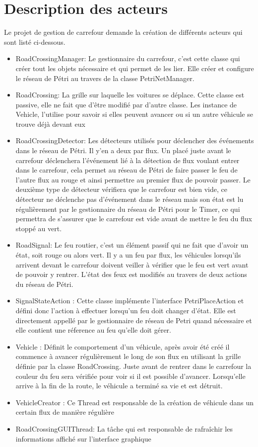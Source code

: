 \chapter{Description des acteurs}

Le projet de gestion de carrefour demande la création de différents acteurs qui sont listé ci-dessous.

\begin{itemize}
\item  RoadCrossingManager: Le gestionnaire du carrefour, c'est cette classe qui créer tout les objets nécessaire et qui permet de les lier. Elle créer et configure le réseau de Pétri au travers de la classe PetriNetManager.
\item RoadCrossing: La grille sur laquelle les voitures se déplace. Cette classe est passive, elle ne fait que d'être modifié par d'autre classe. Les instance de Vehicle, l'utilise pour savoir si elles peuvent avancer ou si un autre véhicule se trouve déjà devant eux
\item RoadCrossingDetector: Les détecteurs utilisés pour déclencher des événements dans le réseau de Pétri. Il y'en a deux par flux. Un placé juste avant le carrefour déclenchera l'événement lié à la détection de flux voulant entrer dans le carrefour, cela permet au réseau de Pétri de faire passer le feu de l'autre flux au rouge et ainsi permettre au premier flux de pouvoir passer. Le deuxième type de détecteur vérifiera que le carrefour est bien vide, ce détecteur ne déclenche pas d'événement dans le réseau mais son état est lu régulièrement par le gestionnaire du réseau de Pétri pour le Timer, ce qui permettra de s'assurer que le carrefour est vide avant de mettre le feu du flux stoppé au vert.
\item RoadSignal: Le feu routier, c'est un élément passif qui ne fait que d'avoir un état, soit rouge ou alors vert. Il y a un feu par flux, les véhicules lorsqu'ils arrivent devant le carrefour doivent veiller à vérifier que le feu est vert avant de pouvoir y rentrer. L'état des feux est modifiés au travers de deux actions du réseau de Pétri.
\item SignalStateAction : Cette classe implémente l'interface PetriPlaceAction et défini donc l'action à effectuer lorsqu'un feu doit changer d'état. Elle est directement appellé par le gestionnaire de réseau de Petri quand nécessaire et elle contient une réference au feu qu'elle doit gérer.
\item Vehicle : Définit le comportement d'un véhicule, après avoir été créé il commence à avancer régulièrement le long de son flux en utilisant la grille définie par la classe RoadCrossing. Juste avant de rentrer dans le carrefour la couleur du feu sera vérifiée pour voir si il est possible d'avancer. Lorsqu'elle arrive à la fin de la route, le véhicule a terminé sa vie et est détruit.
\item VehicleCreator : Ce Thread est responsable de la création de véhicule dans un certain flux de manière régulière
\item RoadCrossingGUIThread: La tâche qui est responsable de rafraîchir les informations affiché sur l'interface graphique
\end{itemize}

